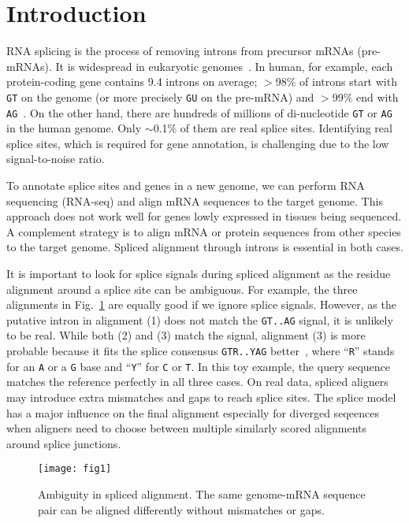 \documentclass[webpdf,contemporary,large,namedate]{oup-authoring-template}%
\begin{document}
\section{Introduction}

RNA splicing is the process of removing introns from precursor mRNAs (pre-mRNAs).
It is widespread in eukaryotic genomes~\citep{Keren:2010aa}.
In human, for example, each protein-coding gene contains 9.4 introns on average;
$>$98\% of introns start with {\tt GT} on the genome (or more precisely {\tt GU} on the pre-mRNA)
and $>$99\% end with {\tt AG}~\citep{Sibley:2016vh}.
On the other hand, there are hundreds of millions of di-nucleotide {\tt GT} or {\tt AG}
in the human genome.
Only $\sim$0.1\% of them are real splice sites.
Identifying real splice sites, which is required for gene annotation,
is challenging due to the low signal-to-noise ratio.

To annotate splice sites and genes in a new genome,
we can perform RNA sequencing (RNA-seq) and align mRNA sequences to the target genome.
This approach does not work well for genes lowly expressed in tissues being sequenced.
A complement strategy is to align mRNA or protein sequences from other species to the target genome.
Spliced alignment through introns is essential in both cases.

It is important to look for splice signals during spliced alignment
as the residue alignment around a splice site can be ambiguous.
For example, the three alignments in Fig.~\ref{fig:1} are equally good if we ignore splice signals.
However, as the putative intron in alignment (1) does not match the {\tt GT..AG}
signal, it is unlikely to be real.
While both (2) and (3) match the signal,
alignment (3) is more probable because it fits the splice consensus {\tt GTR..YAG} better~\citep{Irimia:2008aa,Iwata:2011aa},
where ``{\tt R}'' stands for an {\tt A} or a {\tt G} base and ``{\tt Y}'' for {\tt C} or {\tt T}.
In this toy example, the query sequence matches the reference perfectly in all three cases.
On real data, spliced aligners may introduce extra mismatches and gaps to reach splice sites.
The splice model has a major influence on the final alignment especially for diverged seqeences
when aligners need to choose between multiple similarly scored alignments around splice junctions.

\begin{figure}[b]
\centering
\texttt{[image: fig1]}
\caption{Ambiguity in spliced alignment.
The same genome-mRNA sequence pair can be aligned differently without mismatches or gaps.}\label{fig:1}
\end{figure}
\end{document}

